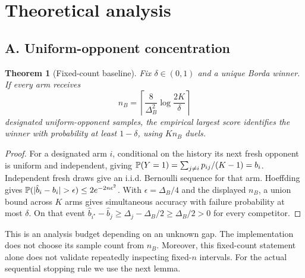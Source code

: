 \documentclass[11pt,a4paper]{article}
\newtheorem{theorem}{Theorem}\newtheorem{lemma}{Lemma}
\begin{document}
\section{Theoretical analysis}
\subsection{A. Uniform-opponent concentration}
\begin{theorem}[Fixed-count baseline]
Fix $\delta\in(0,1)$ and a unique Borda winner. If every arm receives
\[
n_B=\left\lceil\frac8{\Delta_B^2}\log\frac{2K}{\delta}\right\rceil
\]
designated uniform-opponent samples, the empirical largest score identifies the winner with probability at least $1-\delta$, using $Kn_B$ duels.
\end{theorem}
\begin{proof}
For a designated arm $i$, conditional on the history its next fresh opponent is uniform and independent, giving $\mathbb P(Y=1)=\sum_{j\ne i}p_{ij}/(K-1)=b_i$. Independent fresh draws give an i.i.d. Bernoulli sequence for that arm. Hoeffding gives $\Prb(|\hat b_i-b_i|>\epsilon)\le2e^{-2n\epsilon^2}$. With $\epsilon=\Delta_B/4$ and the displayed $n_B$, a union bound across $K$ arms gives simultaneous accuracy with failure probability at most $\delta$. On that event $\hat b_{i^\star}-\hat b_j\ge\Delta_j-\Delta_B/2\ge\Delta_B/2>0$ for every competitor.
\end{proof}
This is an analysis budget depending on an unknown gap. The implementation does not choose its sample count from $n_B$. Moreover, this fixed-count statement alone does not validate repeatedly inspecting fixed-$n$ intervals. For the actual sequential stopping rule we use the next lemma.
\end{document}
